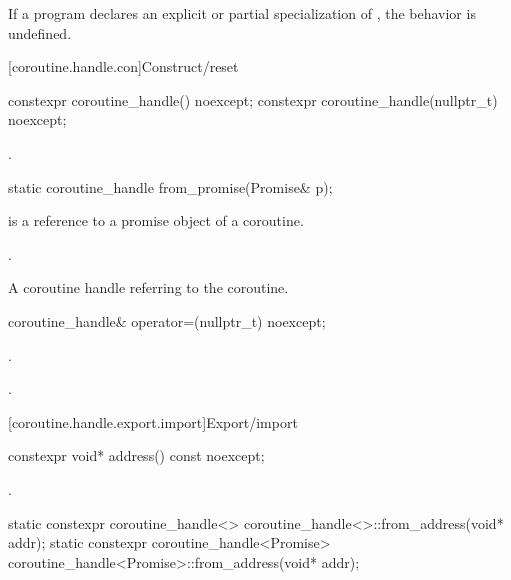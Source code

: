 \pnum
If a program declares an explicit or partial specialization of
, the behavior is undefined.

[coroutine.handle.con]{Construct/reset}

%
\begin{itemdecl}
constexpr coroutine_handle() noexcept;
constexpr coroutine_handle(nullptr_t) noexcept;
\end{itemdecl}

\begin{itemdescr}
\pnum
\ensures
{}.
\end{itemdescr}

%
\begin{itemdecl}
static coroutine_handle from_promise(Promise& p);
\end{itemdecl}

\begin{itemdescr}
\pnum
\expects
{} is a reference to a promise object of a coroutine.

\pnum
\ensures
{}.

\pnum
\returns
A coroutine handle  referring to the coroutine.
\end{itemdescr}

%
\begin{itemdecl}
coroutine_handle& operator=(nullptr_t) noexcept;
\end{itemdecl}

\begin{itemdescr}
\pnum
\ensures
{}.

\pnum
\returns
{}.
\end{itemdescr}

[coroutine.handle.export.import]{Export/import}

%
\begin{itemdecl}
constexpr void* address() const noexcept;
\end{itemdecl}

\begin{itemdescr}
\pnum
\returns
{}.
\end{itemdescr}

%
\begin{itemdecl}
static constexpr coroutine_handle<> coroutine_handle<>::from_address(void* addr);
static constexpr coroutine_handle<Promise> coroutine_handle<Promise>::from_address(void* addr);
\end{itemdecl}

